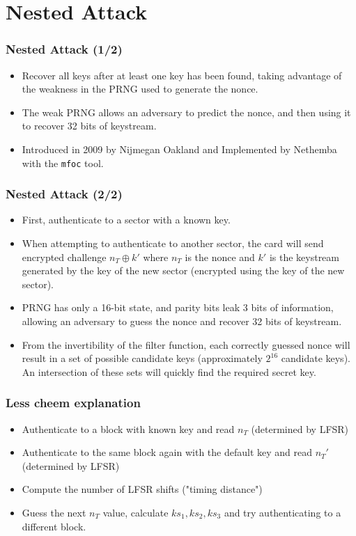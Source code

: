 \documentclass[12pt]{beamer}
\begin{document}
\section{Nested Attack}
\begin{frame}
\frametitle{Nested Attack (1/2)}
\begin{itemize}
	\item Recover all keys after at least one key has been found, taking advantage of the weakness in the PRNG used to generate the nonce.
  \item The weak PRNG allows an adversary to predict the nonce, and then using it to recover 32 bits of keystream.
	\item Introduced in 2009 by Nijmegan Oakland and Implemented by Nethemba with the \texttt{mfoc} tool.
\end{itemize}
\end{frame}

\begin{frame}
\frametitle{Nested Attack (2/2)}
\begin{itemize}
  \item First, authenticate to a sector with a known key.
  \item When attempting to authenticate to another sector, the card will send encrypted challenge $n_T\oplus k'$ where $n_T$ is the nonce and $k'$ is the keystream generated by the key of the new sector (encrypted using the key of the new sector).
  \item PRNG has only a 16-bit state, and parity bits leak 3 bits of information, allowing an adversary to guess the nonce and recover 32 bits of keystream.
  \item From the invertibility of the filter function, each correctly guessed nonce will result in a set of possible candidate keys (approximately $2^16$ candidate keys). An intersection of these sets will quickly find the required secret key.
\end{itemize}
\end{frame}

\begin{frame}
\frametitle{Less cheem explanation}
\begin{itemize}
	\item Authenticate to a block with known key and read $n_T$ (determined by LFSR)
	\item Authenticate to the same block again with the default key and read $n_T'$ (determined by LFSR)
	\item Compute the number of LFSR shifts ("timing distance")
	\item Guess the next $n_T$ value, calculate $ks_1, ks_2, ks_3$ and try authenticating to a different block.
\end{itemize}
\end{frame}
\end{document}

